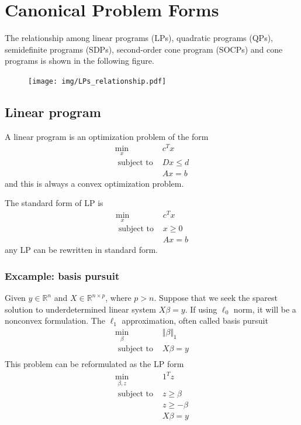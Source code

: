 \documentclass[a4paper]{article}
\begin{document}
{\section{Canonical Problem Forms}
The relationship among linear programs (LPs), quadratic programs (QPs), semidefinite programs (SDPs), second-order cone program (SOCPs) and cone programs is shown in the following figure.
\begin{figure}[htbp] 
  \centering 
  \texttt{[image: img/LPs\_relationship.pdf]} 
\end{figure}

\subsection{Linear program}
\begin{defi}
  A linear program is an optimization problem of the form
  \[
  \begin{array}{ll}
      \min\limits_{x} & c^T x  \\
      \text { subject to } & Dx \leq d \\ \nonumber
      & Ax = b
  \end{array} 
  \]
  and this is always a convex optimization problem.
\end{defi}

\noindent The standard form of LP is 
\begin{equation}
  \begin{array}{ll}
    \min\limits_{x} & c^T x  \\
    \text { subject to } & x \geq 0 \\ \nonumber
    & Ax = b
\end{array} 
\end{equation}
any LP can be rewritten in standard form.

\subsubsection{Excample: basis pursuit}
Given $y \in \mathbb{R}^n$ and $X \in \mathbb{R}^{n \times p}$, where $p > n$. Suppose that we seek the sparest solution to underdetermined linear system $X \beta = y$. If using $\ell_0$ norm, it will be a nonconvex formulation. The $\ell_1$ approximation, often called basis pursuit
\begin{equation}
  \begin{array}{ll}
    \min\limits_{\beta} & \Vert \beta \Vert_1  \\ \nonumber
    \text { subject to } & X \beta = y \\ 
\end{array} 
\end{equation}
This problem can be reformulated as the LP form 
\begin{equation}
  \begin{array}{ll}
    \min\limits_{\beta, z} & 1^T z  \\ \nonumber
    \text { subject to } & z \geq \beta \\
    & z \geq -\beta \\
    & X \beta = y
\end{array} 
\end{equation}

}
\end{document}
